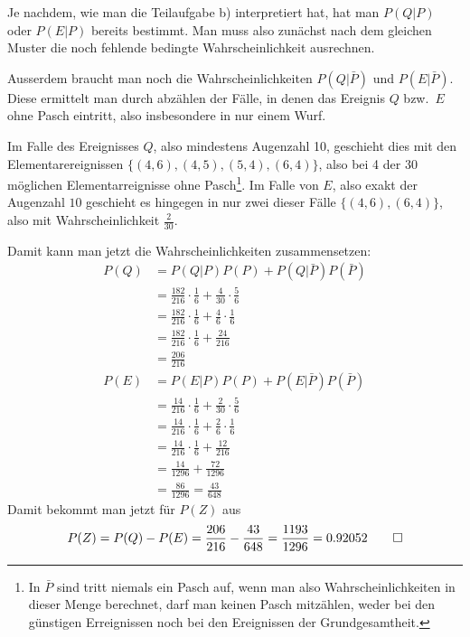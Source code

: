 \begin{loesung}
\begin{teilaufgaben}
Je nachdem, wie man die Teilaufgabe b) interpretiert hat, hat man $P(Q|P)$
oder $P(E|P)$ bereits bestimmt. Man muss also zunächst nach dem gleichen
Muster die noch fehlende bedingte Wahrscheinlichkeit ausrechnen.

Ausserdem braucht man noch die Wahrscheinlichkeiten $P(Q|\bar P)$ und
$P(E|\bar P)$. Diese ermittelt man durch abzählen der Fälle, in denen
das Ereignis $Q$ bzw.~$E$ ohne Pasch eintritt, also insbesondere in nur
einem Wurf.

Im Falle des Ereignisses $Q$, also mindestens Augenzahl 10, geschieht dies
mit den Elementarereignissen $\{(4,6),(4,5),(5,4),(6,4)\}$, also bei 4 der 30
möglichen Elementarreignisse ohne Pasch\footnote{In $\bar P$ sind tritt
niemals ein Pasch auf, wenn man also Wahrscheinlichkeiten in dieser Menge
berechnet, darf man keinen Pasch mitzählen, weder bei den
günstigen Erreignissen noch bei den Ereignissen der Grundgesamtheit.}.
Im Falle von $E$, also exakt
der Augenzahl $10$ geschieht es hingegen in nur zwei dieser
Fälle $\{(4,6), (6,4)\}$, also mit Wahrscheinlichkeit $\frac{2}{30}$.

Damit kann man jetzt die Wahrscheinlichkeiten zusammensetzen:
\begin{align*}
P(Q)&=P(Q|P)P(P) + P(Q|\bar P)P(\bar P)\\
    &=\frac{182}{216}\cdot\frac16 + \frac4{30}\cdot\frac56\\
    &=\frac{182}{216}\cdot\frac16 + \frac4{6}\cdot\frac16\\
    &=\frac{182}{216}\cdot\frac16 + \frac{24}{216}\\
    &=\frac{206}{216}\\
P(E)&=P(E|P)P(P) + P(E|\bar P)P(\bar P)\\
    &=\frac{14}{216}\cdot\frac16 + \frac2{30}\cdot\frac56\\
    &=\frac{14}{216}\cdot\frac16 + \frac2{6}\cdot\frac16\\
    &=\frac{14}{216}\cdot\frac16 + \frac{12}{216}\\
    &=\frac{14}{1296} + \frac{72}{1296}\\
    &=\frac{86}{1296}
    =\frac{43}{648}
\end{align*}
Damit bekommt man jetzt für $P(Z)$ aus
\[
P(Z)=P(Q)-P(E)
=
    \frac{206}{216}
    -\frac{43}{648}
=\frac{1193}{1296}=0.92052
\qedhere
\]
\end{teilaufgaben}
\end{loesung}

